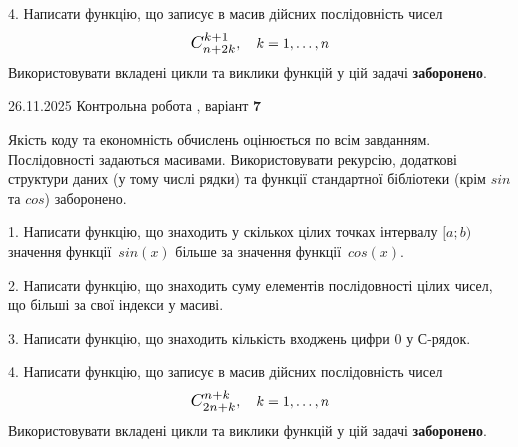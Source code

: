\documentclass[11pt, ukrainian]{article}
\begin{document}
{{{{{{\begin {large}

4. 
Написати функцію, що записує в масив дійсних послідовність чисел
$$\scalebox{1.2}{$C_{n+2k}^{k+1}$}, \quad k=1,\ldots,n$$
\quad Використовувати вкладені цикли та виклики функцій у цій задачі \textbf{заборонено}.

\vspace{2mm}

\end{large}
\newpage
{{26.11.2025 Контрольна робота , варіант  \No \textbf { 7 }\par}}


{
Якість коду та економність обчислень оцінюється по всім завданням. Послідовності задаються масивами. Використовувати рекурсію, додаткові структури даних (у тому числі рядки) та функції стандартної бібліотеки (крім $sin$ та $cos$) заборонено.

\vspace{2mm}

\begin {large}
1. Написати функцію, що знаходить у скількох цілих точках інтервалу $[a; b)$ значення функції~$sin(x)$ більше за значення функції~$cos(x)$.

\vspace{2mm}


2. Написати функцію, що знаходить суму елементів послідовності цілих чисел, що більші за свої індекси у масиві.

\vspace{2mm}


3. Написати функцію, що знаходить кількість входжень цифри 0 у С-рядок.

\vspace{2mm}


4. 
Написати функцію, що записує в масив дійсних послідовність чисел
$$\scalebox{1.2}{$C_{2n+k}^{n+k}$}, \quad k=1,\ldots,n$$
\quad Використовувати вкладені цикли та виклики функцій у цій задачі \textbf{заборонено}.

\vspace{2mm}


\end{large}}}}}}}}
\end{document}
